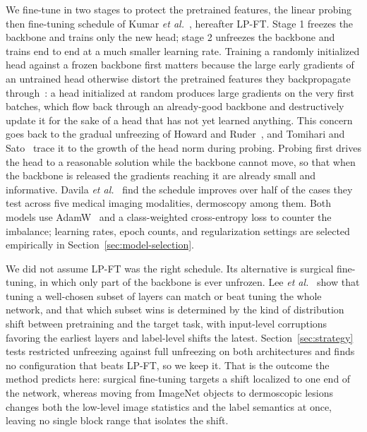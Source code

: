 \documentclass[10pt,twocolumn,letterpaper]{article}
\providecommand{\etal}{\textit{et al.}}
\begin{document}
We fine-tune in two stages to protect the pretrained features, the linear
probing then fine-tuning schedule of Kumar \etal~\cite{kumar2022finetuning},
hereafter LP-FT. Stage 1 freezes the backbone and trains only the new head;
stage 2 unfreezes the backbone and trains end to end at a much smaller learning
rate. Training a randomly initialized head against a frozen backbone first
matters because the large early gradients of an untrained head otherwise distort
the pretrained features they backpropagate through~\cite{kumar2022finetuning}: a
head initialized at random produces large gradients on the very first batches,
which flow back through an already-good backbone and destructively update it
for the sake of a head that has not yet learned anything. This concern goes
back to the gradual unfreezing of Howard and Ruder~\cite{howard2018ulmfit},
and Tomihari and Sato~\cite{tomihari2024ntk} trace it to the growth of the
head norm during probing. Probing first drives the head to a reasonable
solution while the backbone cannot move, so that when the backbone is
released the gradients reaching it are already small and informative. Davila
\etal~\cite{davila2024comparison} find the schedule improves over half of the
cases they test across five medical imaging modalities, dermoscopy among them.
Both models use AdamW~\cite{loshchilov2019adamw} and a class-weighted
cross-entropy loss to counter the imbalance; learning rates, epoch counts,
and regularization settings are selected empirically in
Section~\ref{sec:model-selection}.

We did not assume LP-FT was the right schedule. Its alternative is surgical
fine-tuning, in which only part of the backbone is ever unfrozen. Lee
\etal~\cite{lee2023surgical} show that tuning a well-chosen subset of layers can
match or beat tuning the whole network, and that which subset wins is determined
by the kind of distribution shift between pretraining and the target task, with
input-level corruptions favoring the earliest layers and label-level shifts the
latest. Section~\ref{sec:strategy} tests restricted unfreezing against full
unfreezing on both architectures and finds no configuration that beats LP-FT, so
we keep it. That is the outcome the method predicts here: surgical fine-tuning
targets a shift localized to one end of the network, whereas moving from ImageNet
objects to dermoscopic lesions changes both the low-level image statistics and the
label semantics at once, leaving no single block range that isolates the shift.

\end{document}
